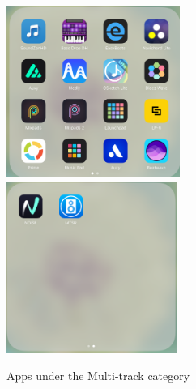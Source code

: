 \bigskip
\begin{figure}[h]
  \includegraphics[width=0.505\textwidth]{images/Multi-track2.png}
  \includegraphics[width=0.495\textwidth]{images/Multi-track1.png}
  \caption{Apps under the Multi-track category}
  \label{fig: Multi}
\end{figure}
\bigskip
\clearpage
